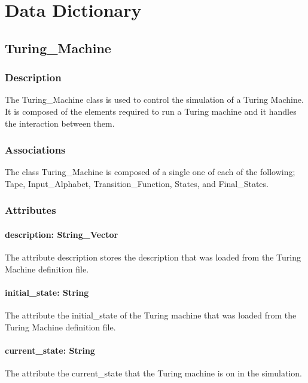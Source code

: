 \documentclass{report}
\begin{document}

\chapter{Data Dictionary}

    \section{Turing\_Machine}
	\subsection{Description}
    
    The Turing\_Machine class is used to control the simulation of a Turing Machine. It is composed of the elements required to run a Turing machine and it handles the interaction between them.
    
    \subsection{Associations} 
    The class Turing\_Machine is composed of a single one of each of the following; Tape, Input\_Alphabet, Transition\_Function, States, and Final\_States.
    \subsection{Attributes} 
    
      \subsubsection{ description: String\_Vector }
      The attribute description stores the description that was loaded from the Turing Machine definition file.
      
      \subsubsection{ initial\_state: String }
      The attribute the initial\_state of the Turing machine that was loaded from the Turing Machine definition file.
      
      \subsubsection{ current\_state: String  }
      The attribute the current\_state that the Turing machine is on in the simulation.
      
\end{document}
